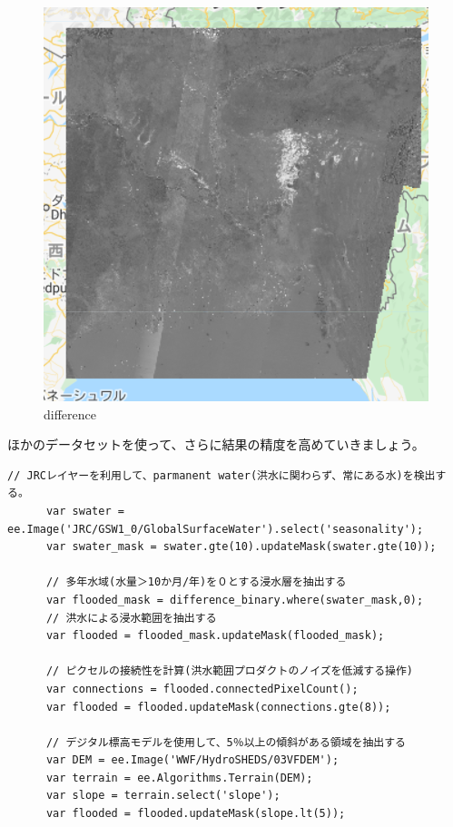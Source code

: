 \documentclass[
]{book}
\begin{document}
\begin{figure}
\centering
\includegraphics{images/difference.png}
\caption{difference}
\end{figure}

ほかのデータセットを使って、さらに結果の精度を高めていきましょう。

\begin{verbatim}
// JRCレイヤーを利用して、parmanent water(洪水に関わらず、常にある水)を検出する。
      var swater = ee.Image('JRC/GSW1_0/GlobalSurfaceWater').select('seasonality');
      var swater_mask = swater.gte(10).updateMask(swater.gte(10));　
      
      // 多年水域(水量＞10か月/年)を０とする浸水層を抽出する
      var flooded_mask = difference_binary.where(swater_mask,0);
      // 洪水による浸水範囲を抽出する
      var flooded = flooded_mask.updateMask(flooded_mask);
      
      // ピクセルの接続性を計算(洪水範囲プロダクトのノイズを低減する操作)
      var connections = flooded.connectedPixelCount();    
      var flooded = flooded.updateMask(connections.gte(8));
      
      // デジタル標高モデルを使用して、5％以上の傾斜がある領域を抽出する
      var DEM = ee.Image('WWF/HydroSHEDS/03VFDEM');
      var terrain = ee.Algorithms.Terrain(DEM);
      var slope = terrain.select('slope');
      var flooded = flooded.updateMask(slope.lt(5));
\end{verbatim}
\end{document}

